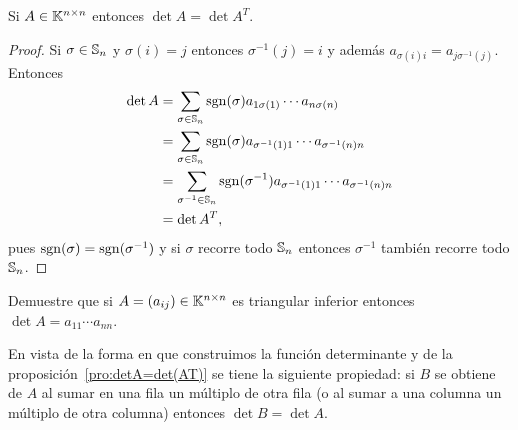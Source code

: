 \begin{prop}
	\label{pro:detA=det(AT)}
    Si $A\in\mathbb{K}^{n\times n}$ entonces $\det A=\det A^T$.    

    \begin{proof}
        Si $\sigma\in\mathbb{S}_n$ y $\sigma(i)=j$ entonces
        $\sigma^{-1}(j)=i$ y además $a_{\sigma(i)i}=a_{j\sigma^{-1}(j)}$. Entonces
        \begin{align*}
            \det A&=\sum_{\sigma\in\mathbb{S}_n}\operatorname{sgn}(\sigma)a_{1\sigma(1)}\cdots a_{n\sigma(n)}\\
            &=\sum_{\sigma\in\mathbb{S}_n}\operatorname{sgn}(\sigma)a_{\sigma^{-1}(1)1}\cdots a_{\sigma^{-1}(n)n}\\
            &=\sum_{\sigma^{-1}\in\mathbb{S}_n}\operatorname{sgn}(\sigma^{-1})a_{\sigma^{-1}(1)1}\cdots a_{\sigma^{-1}(n)n}\\
			&=\det A^T,
        \end{align*}
		pues $\operatorname{sgn}(\sigma)=\operatorname{sgn}(\sigma^{-1})$ y si $\sigma$ recorre todo $\mathbb{S}_n$
		entonces $\sigma^{-1}$ también recorre todo $\mathbb{S}_n$. 
    \end{proof}
\end{prop}

\begin{xca}
	Demuestre que si $A=(a_{ij})\in\mathbb{K}^{n\times n}$ es triangular inferior
	entonces $\det A=a_{11}\cdots a_{nn}$.
\end{xca}

\begin{block}
	En vista de la forma en que construimos la función determinante	y de la
	proposición~\ref{pro:detA=det(AT)} se tiene la siguiente propiedad: si $B$
	se obtiene de $A$ al sumar en una fila un múltiplo de otra fila
	(o al sumar a una columna un múltiplo de otra columna) entonces $\det B=\det A$.
\end{block}

